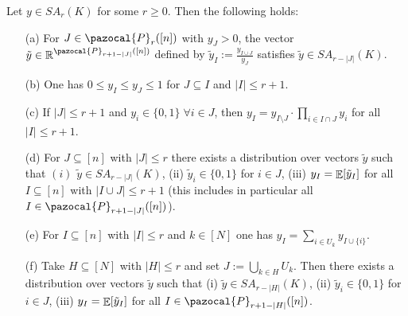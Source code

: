 \begin{theorem} \label{thm:PropertiesOfSA}
  Let $y \in SA_r(K)$ for some $r \geq 0$. Then the following holds: 
  \begin{enumerate}
  \item[(a)] For $J \in \pazocal{P}_r([n])$ with $y_{J} > 0$, the vector $\tilde{y} \in \setR^{\pazocal{P}_{r+1-|J|}([n])}$ defined by $\tilde{y}_{I} := \frac{y_{I \cup J}}{y_J}$ satisfies $\tilde{y} \in SA_{r-|J|}(K)$.
  \item[(b)] One has $0 \leq y_{I} \leq y_J \leq 1$ for $J \subseteq I$ and $|I| \leq r+1$.
  \item[(c)] If $|J| \leq r+1$ and $y_i \in \{ 0,1\} \; \forall i \in J$, then $y_I = y_{I \setminus J} \cdot \prod_{i \in I \cap J} y_i$ for all $|I| \leq r+1$.
  \item[(d)] For $J \subseteq [n]$ with $|J| \leq r$ there exists a distribution over vectors $\tilde{y}$ such that $(i)$ $\tilde{y} \in SA_{r-|J|}(K)$, (ii) $\tilde{y}_i \in \{ 0,1\}$ for $i \in J$, (iii) $y_I = \mathop{\mathbb{E}}[\tilde{y}_I]$ for all $I \subseteq [n]$ with $|I \cup J| \leq r+1$ (this includes in particular all $I \in \pazocal{P}_{r+1-|J|}([n])$).
    \item[(e)] For $I \subseteq [n]$ with $|I| \leq r$ and $k \in [N]$ one has $y_I = \sum_{i \in U_k}y_{I \cup \{i\}}$.
  \item[(f)] Take $H \subseteq [N]$ with $|H| \leq r$ and set $J := \bigcup_{k \in H} U_k$. Then there exists a distribution over vectors $\tilde{y}$ such that (i) $\tilde{y} \in SA_{r-|H|}(K)$, (ii) $\tilde{y}_i \in \{ 0,1\}$ for $i \in J$, (iii) $y_I = \mathop{\mathbb{E}}[\tilde{y}_I]$ for all $I \in \pazocal{P}_{r+1-|H|}([n])$.
  \end{enumerate}
  
\end{theorem}

